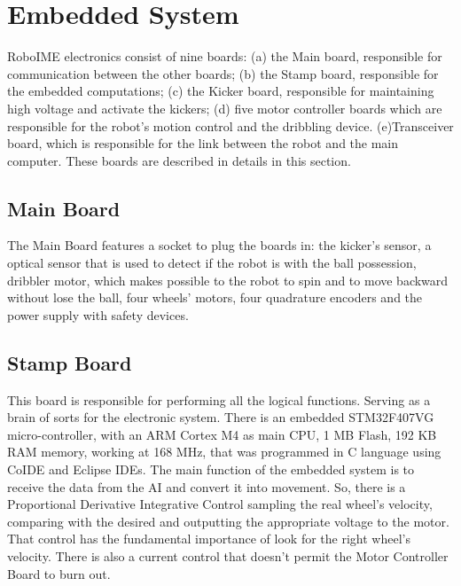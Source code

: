 \section{Embedded System}\label{emb_sys_sec}
RoboIME electronics consist of nine boards: (a) the Main board, responsible for communication between the other boards; (b) the Stamp board, responsible for the embedded computations; (c) the Kicker board, responsible for maintaining high voltage and activate the kickers; (d) five motor controller boards which are responsible for the robot's motion control and the dribbling device. (e)Transceiver board, which is responsible for the link between the robot and the main computer. These boards are described in details in this section.

\subsection{Main Board}
The Main Board features a socket to plug the boards in: the kicker's sensor, a optical sensor that is used to detect if the robot is with the ball possession, dribbler motor, which makes possible to the robot to spin and to move backward without lose the ball, four wheels' motors, four quadrature encoders and the power supply with safety devices. 



\subsection{Stamp Board}
This board is responsible  for performing all the logical functions. Serving as a brain of sorts for the electronic system. There is an embedded STM32F407VG micro-controller, with an ARM Cortex M4 as main CPU, 1 MB Flash, 192 KB RAM memory, working at 168 MHz, that was programmed in C language using CoIDE and Eclipse IDEs. The main function of the embedded system is to receive the data from the AI and convert it into movement. So, there is a Proportional Derivative Integrative Control sampling the real wheel's velocity, comparing with the desired and outputting the appropriate voltage to the motor. That control has the fundamental importance of look for the right wheel's velocity. There is also a current control that doesn't permit the Motor Controller Board to burn out. 

